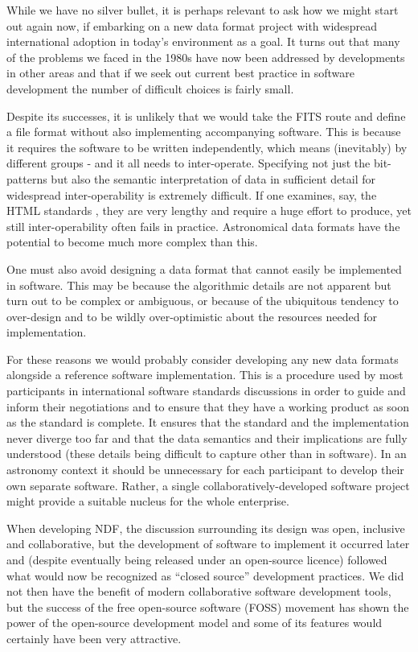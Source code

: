 \documentclass[final,authoryear,5p,times,twocolumn]{elsarticle}
\begin{document}
While we have no silver bullet, it is perhaps relevant to ask how we
might start out again now, if embarking on a new data format project
with widespread international adoption in today's environment as a
goal. It turns out that many of the problems we faced in the 1980s
have now been addressed by developments in other areas and that if we
seek out current best practice in software development the number of
difficult choices is fairly small.

Despite its successes, it is unlikely that we would take the FITS
route and define a file format without also implementing accompanying
software. This is because it requires the software to be written
independently, which means (inevitably) by different groups - and it
all needs to inter-operate. Specifying not just the bit-patterns but
also the semantic interpretation of data in sufficient detail for
widespread inter-operability is extremely difficult. If one examines,
say, the HTML standards \citep{w3chtml5}, they are very
lengthy and require a huge effort to produce, yet still
inter-operability often fails in practice. Astronomical data formats
have the potential to become much more complex than this.

One must also avoid designing a data format that cannot easily be
implemented in software. This may be because the algorithmic details
are not apparent but turn out to be complex or ambiguous, or because
of the ubiquitous tendency to over-design and to be wildly
over-optimistic about the resources needed for implementation.

For these reasons we would probably consider developing any new data
formats alongside a reference software implementation. This is a
procedure used by most participants in international software
standards discussions in order to guide and inform their negotiations
and to ensure that they have a working product as soon as the standard
is complete. It ensures that the standard and the implementation never
diverge too far and that the data semantics and their implications are
fully understood (these details being difficult to capture other than
in software). In an astronomy context it should be unnecessary for
each participant to develop their own separate software. Rather, a
single collaboratively-developed software project might provide a
suitable nucleus for the whole enterprise.

When developing NDF, the discussion surrounding its design
was open, inclusive and collaborative, but the development of software
to implement it occurred later and (despite eventually being released
under an open-source licence) followed what would now be recognized as
``closed source'' development practices. We did not then have the
benefit of modern collaborative software development tools, but the
success of the free open-source software (FOSS) movement has shown the
power of the open-source development model and some of its features
would certainly have been very attractive.
\end{document}
